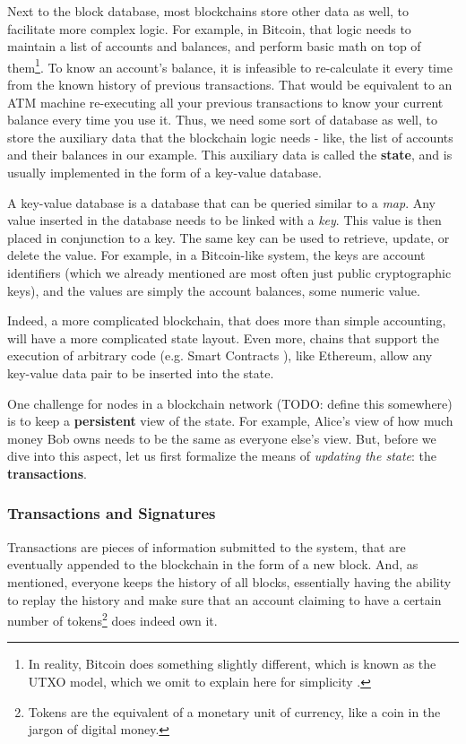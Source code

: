 Next to the block database, most blockchains store other data as well, to facilitate more complex
logic. For example, in Bitcoin, that logic needs to maintain a list of accounts and balances, and
perform basic math on top of them\footnote{In reality, Bitcoin does something slightly different,
which is known as the UTXO model, which we omit to explain here for simplicity
\cite{delgado-seguraAnalysisBitcoinUTXO2017}.}. To know an account's balance, it is infeasible to
re-calculate it every time from the known history of previous transactions. That would be equivalent
to an ATM machine re-executing all your previous transactions to know your current balance every
time you use it. Thus, we need some sort of database as well, to store the auxiliary data that the
blockchain logic needs - like, the list of accounts and their balances in our example. This
auxiliary data is called the \textbf{state}, and is usually implemented in the form of a key-value
database.

A key-value database is a database that can be queried similar to a \textit{map}. Any value inserted
in the database needs to be linked with a \textit{key}. This value is then placed in conjunction to
a key. The same key can be used to retrieve, update, or delete the value. For example, in a
Bitcoin-like system, the keys are account identifiers (which we already mentioned are most often
just public cryptographic keys), and the values are simply the account balances, some numeric value.

Indeed, a more complicated blockchain, that does more than simple accounting, will have a more
complicated state layout. Even more, chains that support the execution of arbitrary code (e.g. Smart
Contracts \cite{EthereumWhitepaper}), like Ethereum, allow any key-value data pair to be inserted
into the state.

One challenge for nodes in a blockchain network (TODO: define this somewhere) is to keep a
\textbf{persistent} view of the state. For example, Alice's view of how much money Bob owns needs to
be the same as everyone else's view. But, before we dive into this aspect, let us first formalize
the means of \textit{updating the state}: the \textbf{transactions}.

\subsubsection{Transactions and Signatures} \label{chap_bg:subsec:transaction_sig}

Transactions are pieces of information submitted to the system, that are eventually appended to the
blockchain in the form of a new block. And, as mentioned, everyone keeps the history of all blocks,
essentially having the ability to replay the history and make sure that an account claiming to have
a certain number of tokens\footnote{Tokens are the equivalent of a monetary unit of currency, like a
coin in the jargon of digital money.} does indeed own it.

